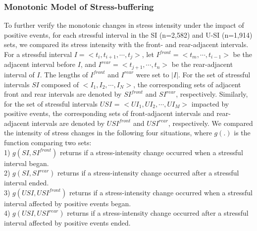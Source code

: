 \subsubsection{Monotonic Model of Stress-buffering}
\label{sec:mono}
To further verify the monotonic changes in stress intensity under the impact of positive events,
for each stressful interval in the SI (n=2,582) and U-SI (n=1,914) sets,
we compared its stress intensity with the front- and rear-adjacent intervals.
For a stressful interval $I = <t_i,t_{i+1},\cdots,t_j>$,
let $I^{front} = <t_m,\cdots,t_{i-1}>$ be the adjacent interval before $I$,
and $I^{rear} = <t_{j+1},\cdots,t_n>$ be the rear-adjacent interval of $I$.
The lengths of $I^{front}$ and $I^{rear}$ were set to $|I|$.
For the set of stressful intervals $SI$ composed of $<I_1,I_2,\cdots,I_N>$,
the corresponding sets of adjacent front and rear intervals are denoted by $SI^{front}$ and $SI^{rear}$, respectively.
Similarly, for the set of stressful intervals $USI$ = $<UI_1,UI_2,\cdots, UI_M>$ impacted by positive events,
the corresponding sets of front-adjacent intervals and rear-adjacent intervals are denoted by $USI^{front}$ and $USI^{rear}$, respectively.
We compared the intensity of stress changes in the following four situations,
where $g(.)$ is the function comparing two sets: \\
1) $g(SI,SI^{front})$ returns if a stress-intensity change occurred when a stressful interval began.\\
2) $g(SI,SI^{rear})$ returns if a stress-intensity change occurred after a stressful interval ended.\\
3) $g(USI,USI^{front})$ returns if a stress-intensity change occurred when a stressful interval affected by positive events began.\\
4) $g(USI,USI^{rear})$ returns if a stress-intensity change occurred after a stressful interval affected by positive events ended.

